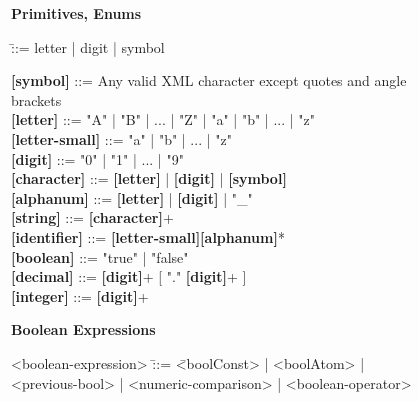 


\begin{figure}[p]
\begin{tcolorbox}[title=iStar-DT-X Grammar,colbacktitle=orange!40!white,coltitle=black,fonttitle=\bfseries,adjusted title=iStarDT-X Grammar (1/3),halign title=flush center]

\rmfamily
\begin{footnotesize}
\textbf{Primitives, Enums}
\end{footnotesize}
\ttfamily

\vspace{-3mm}

\begin{scriptsize}
\begin{tabbing}
[identifierr] \= ::= letter | digit | symbol \kill

\textbf{[symbol]} \> ::= Any valid XML character except quotes and angle brackets \\
\textbf{[letter]} \> ::= "A" | "B" | ... | "Z" | "a" | "b" | ... | "z" \\
\textbf{[letter-small]} \> ::= "a" | "b" | ... | "z" \\
\textbf{[digit]} \> ::= "0" | "1" | ... | "9" \\
\textbf{[character]} \> ::= \textbf{[letter]} | \textbf{[digit]} | \textbf{[symbol]} \\
\textbf{[alphanum]} \> ::= \textbf{[letter]} | \textbf{[digit]} | "\_" \\
\textbf{[string]} \>  ::= \textbf{[character]}+ \\
\textbf{[identifier]} \>  ::= \textbf{[letter-small]}\textbf{[alphanum]}* \\
\textbf{[boolean]} \> ::= "true" | "false" \\
\textbf{[decimal]} \> ::= \textbf{[digit]}+ [ "." \textbf{[digit]}+ ]\\
\textbf{[integer]} \> ::= \textbf{[digit]}+ \\
\end{tabbing}
\end{scriptsize}

\vspace{-2mm}

\rmfamily
\begin{footnotesize}
\textbf{Boolean Expressions}
\end{footnotesize}
\ttfamily
\vspace{-3mm}

\begin{scriptsize}
\begin{tabbing}
<boolean-expression> \= ::= \= <boolConst> | <boolAtom> | <previous-bool> | <numeric-comparison> | <boolean-operator> \kill




\end{tabbing}
\end{scriptsize}
\end{tcolorbox}
\end{figure}
